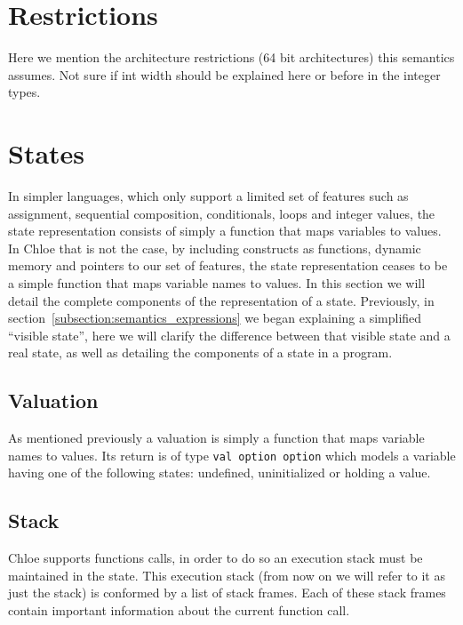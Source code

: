 \section{Restrictions}\label{subsection:restrictions_commands}
Here we mention the architecture restrictions (64 bit architectures) this semantics assumes.
Not sure if int width should be explained here or before in the integer types.


\section{States}\label{section:states}

In simpler languages, which only support a limited set of features such as assignment, sequential composition, conditionals, loops and integer values, the state representation consists of simply a function that maps variables to values.
In Chloe that is not the case, by including constructs as functions, dynamic memory and pointers to our set of features, the state representation ceases to be a simple function that maps variable names to values.
In this section we will detail the complete components of the representation of a state.
Previously, in section~\ref{subsection:semantics_expressions} we began explaining a simplified ``visible state'', here we will clarify the difference between that visible state and a real state, as well as detailing the components of a state in a program.

\subsection{Valuation}\label{subsection:valuation}

As mentioned previously a valuation is simply a function that maps variable names to values.
Its return is of type \verb|val option option| which models a variable having one of the following states: undefined, uninitialized or holding a value.


\subsection{Stack}\label{subsection:stack}

Chloe supports functions calls, in order to do so an execution stack must be maintained in the state.
This execution stack (from now on we will refer to it as just the stack) is conformed by a list of stack frames.
Each of these stack frames contain important information about the current function call.

